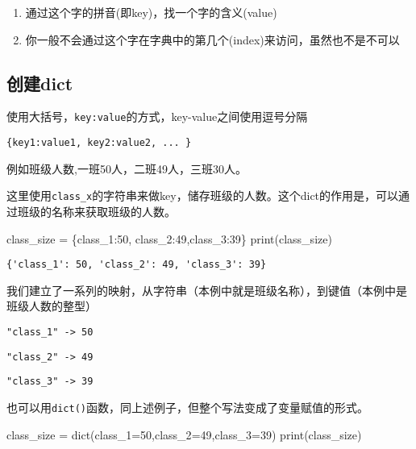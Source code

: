 \documentclass[
  letterpaper,
  DIV=11,
  numbers=noendperiod]{scrreprt}
\newenvironment{Shaded}{\begin{snugshade}}{\end{snugshade}}
\newcommand{\BuiltInTok}[1]{\textcolor[rgb]{0.00,0.23,0.31}{#1}}
\newcommand{\DecValTok}[1]{\textcolor[rgb]{0.68,0.00,0.00}{#1}}
\newcommand{\NormalTok}[1]{\textcolor[rgb]{0.00,0.23,0.31}{#1}}
\newcommand{\OperatorTok}[1]{\textcolor[rgb]{0.37,0.37,0.37}{#1}}
\newcommand{\StringTok}[1]{\textcolor[rgb]{0.13,0.47,0.30}{#1}}
\providecommand{\tightlist}{%
  \setlength{\itemsep}{0pt}\setlength{\parskip}{0pt}}\usepackage{longtable,booktabs,array}
\begin{document}
\begin{enumerate}
\def\labelenumi{\arabic{enumi}.}
\tightlist
\item
  通过这个字的拼音(即key)，找一个字的含义(value)
\item
  你一般不会通过这个字在字典中的第几个(index)来访问，虽然也不是不可以
\end{enumerate}

\hypertarget{ux521bux5efadict}{%
\subsection{创建dict}\label{ux521bux5efadict}}

使用大括号，\texttt{key:value}的方式，key-value之间使用逗号分隔

\texttt{\{key1:value1,\ key2:value2,\ ...\ \}}

例如班级人数,一班50人，二班49人，三班30人。

这里使用\texttt{class\_x}的字符串来做key，储存班级的人数。这个dict的作用是，可以通过班级的名称来获取班级的人数。

\begin{Shaded}
\begin{Highlighting}[]
\NormalTok{class\_size }\OperatorTok{=}\NormalTok{ \{}\StringTok{\textquotesingle{}class\_1\textquotesingle{}}\NormalTok{:}\DecValTok{50}\NormalTok{, }\StringTok{\textquotesingle{}class\_2\textquotesingle{}}\NormalTok{:}\DecValTok{49}\NormalTok{,}\StringTok{\textquotesingle{}class\_3\textquotesingle{}}\NormalTok{:}\DecValTok{39}\NormalTok{\}}
\BuiltInTok{print}\NormalTok{(class\_size)}
\end{Highlighting}
\end{Shaded}

\begin{verbatim}
{'class_1': 50, 'class_2': 49, 'class_3': 39}
\end{verbatim}

我们建立了一系列的映射，从字符串（本例中就是班级名称），到键值（本例中是班级人数的整型）

\texttt{"class\_1"\ -\textgreater{}\ 50}

\texttt{"class\_2"\ -\textgreater{}\ 49}

\texttt{"class\_3"\ -\textgreater{}\ 39}

也可以用\texttt{dict()}函数，同上述例子，但整个写法变成了变量赋值的形式。

\begin{Shaded}
\begin{Highlighting}[]
\NormalTok{class\_size }\OperatorTok{=} \BuiltInTok{dict}\NormalTok{(class\_1}\OperatorTok{=}\DecValTok{50}\NormalTok{,class\_2}\OperatorTok{=}\DecValTok{49}\NormalTok{,class\_3}\OperatorTok{=}\DecValTok{39}\NormalTok{)}
\BuiltInTok{print}\NormalTok{(class\_size)}
\end{Highlighting}
\end{Shaded}
\end{document}

